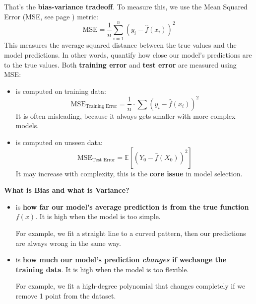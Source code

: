 \noindent
That's the \textbf{bias-variance tradeoff}. To measure this, we use the Mean Squared Error (MSE, see page \pageref{eq: Mean Squared Error}) metric:
\begin{equation*}
    \text{MSE} = \frac{1}{n} \sum_{i=1}^n \left(y_i - \hat{f}(x_i)\right)^2
\end{equation*}
This measures the average squared distance between the true values and the model predictions. In other words, quantify how close our model's predictions are to the true values. Both \textbf{training error} and \textbf{test error} are measured using MSE:
\begin{itemize}
    \item {} is computed on training data:
    \begin{equation}
        \text{MSE}_{\text{Training Error}} = \dfrac{1}{n} \cdot \sum \left(y_i - \hat{f}(x_i)\right)^2
    \end{equation}
    It is often misleading, because it always gets smaller with more complex models.
    \item {} is computed on unseen data:
    \begin{equation}
        \text{MSE}_{\text{Test Error}} = \mathbb{E}\left[\left(Y_0 - \hat{f}(X_0)\right)^2\right]
    \end{equation}
    It may increase with complexity, this is the \textbf{core issue} in model selection.
\end{itemize}


\highspace
\begin{flushleft}
    \textcolor{Green3}{ \textbf{What is Bias and what is Variance?}}
\end{flushleft}
\begin{itemize}
    \item {} is \textbf{how far our model's average prediction is from the true function} $f(x)$. It is high when the model is too simple.

    For example, we fit a straight line to a curved pattern, then our predictions are always wrong in the same way.


    \item {} is \textbf{how much our model's prediction \emph{changes} if we\break change the training data}. It is high when the model is too flexible.

    For example, we fit a high-degree polynomial that changes completely if we remove 1 point from the dataset.
\end{itemize}

